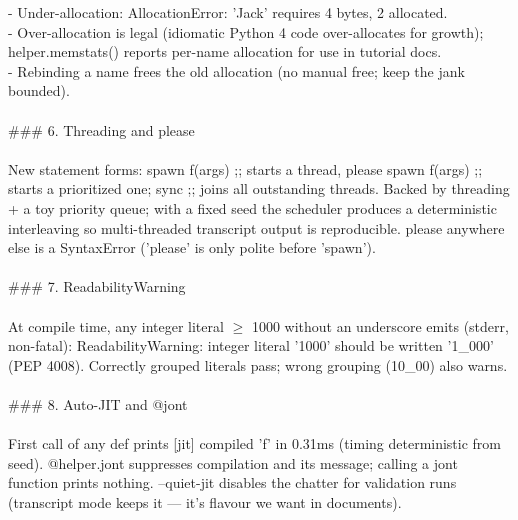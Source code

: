 \begin{exbox}
{  - Under-allocation: \textasciigrave{}AllocationError: 'Jack' requires 4 bytes, 2 allocated\textasciigrave{}. \\
  - Over-allocation is legal (idiomatic Python 4 code over-allocates for growth); \textasciigrave{}helper.memstats()\textasciigrave{} reports per-name allocation for use in tutorial docs. \\
  - Rebinding a name frees the old allocation (no manual \textasciigrave{}free\textasciigrave{}; keep the jank bounded). \\
  \  \\
  \#\#\# 6. Threading and \textasciigrave{}please\textasciigrave{} \\
  \  \\
  New statement forms: \textasciigrave{}spawn f(args) ;;\textasciigrave{} starts a thread, \textasciigrave{}please spawn f(args) ;;\textasciigrave{} starts a prioritized one; \textasciigrave{}sync ;;\textasciigrave{} joins all outstanding threads. Backed by \textasciigrave{}threading\textasciigrave{} + a toy priority queue; with a fixed seed the scheduler produces a deterministic interleaving so multi-threaded transcript output is reproducible. \textasciigrave{}please\textasciigrave{} anywhere else is a SyntaxError (\textasciigrave{}'please' is only polite before 'spawn'\textasciigrave{}). \\
  \  \\
  \#\#\# 7. ReadabilityWarning \\
  \  \\
  At compile time, any integer literal $\geq$ 1000 without an underscore emits (stderr, non-fatal): \textasciigrave{}ReadabilityWarning: integer literal '1000' should be written '1\_000' (PEP 4008)\textasciigrave{}. Correctly grouped literals pass; wrong grouping (\textasciigrave{}10\_00\textasciigrave{}) also warns. \\
  \  \\
  \#\#\# 8. Auto-JIT and \textasciigrave{}@jont\textasciigrave{} \\
  \  \\
  First call of any def prints \textasciigrave{}[jit] compiled 'f' in 0.31ms\textasciigrave{} (timing deterministic from seed). \textasciigrave{}@helper.jont\textasciigrave{} suppresses compilation and its message; calling a jont function prints nothing. \textasciigrave{}--quiet-jit\textasciigrave{} disables the chatter for validation runs (transcript mode keeps it --- it's flavour we want in documents). \\
  \  \\
}
\end{exbox}

